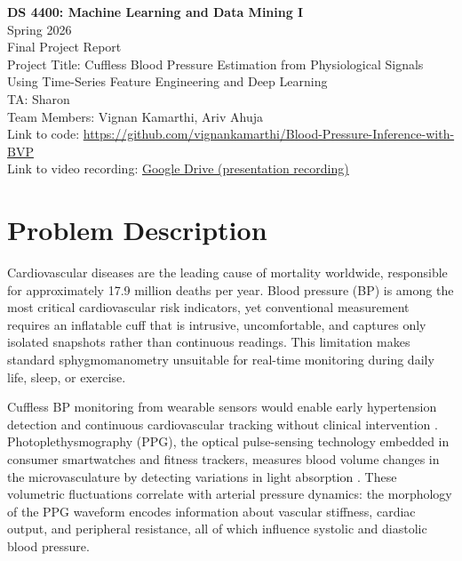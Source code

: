 \documentclass[11pt]{article}
\begin{document}
\begin{center}
{\Large \textbf{DS 4400: Machine Learning and Data Mining I}} \\[0.3em]
{\large Spring 2026} \\[0.3em]
{\large Final Project Report} \\[1em]
{\large Project Title: Cuffless Blood Pressure Estimation from Physiological Signals \\
Using Time-Series Feature Engineering and Deep Learning} \\[0.8em]
TA: Sharon \\
Team Members: Vignan Kamarthi, Ariv Ahuja \\[0.5em]
Link to code: \url{https://github.com/vignankamarthi/Blood-Pressure-Inference-with-BVP} \\
Link to video recording: \href{https://drive.google.com/file/d/1pHHSad5m9Fa_R9RZBZAFqYrWz3Q7Gr03/view?usp=share_link}{Google Drive (presentation recording)}
\end{center}

\section{Problem Description}

Cardiovascular diseases are the leading cause of mortality worldwide, responsible for approximately 17.9 million deaths per year. Blood pressure (BP) is among the most critical cardiovascular risk indicators, yet conventional measurement requires an inflatable cuff that is intrusive, uncomfortable, and captures only isolated snapshots rather than continuous readings. This limitation makes standard sphygmomanometry unsuitable for real-time monitoring during daily life, sleep, or exercise.

Cuffless BP monitoring from wearable sensors would enable early hypertension detection and continuous cardiovascular tracking without clinical intervention \citep{zhao2023cuffless}. Photoplethysmography (PPG), the optical pulse-sensing technology embedded in consumer smartwatches and fitness trackers, measures blood volume changes in the microvasculature by detecting variations in light absorption \citep{elgendi2019ppg}. These volumetric fluctuations correlate with arterial pressure dynamics: the morphology of the PPG waveform encodes information about vascular stiffness, cardiac output, and peripheral resistance, all of which influence systolic and diastolic blood pressure.
\end{document}
